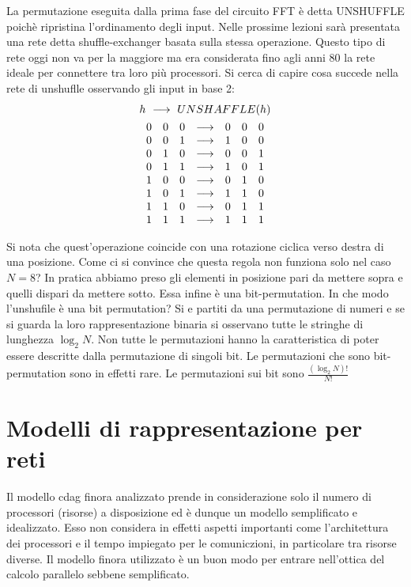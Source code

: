 \documentclass[a4paper,portrait,12pt]{article}
\theoremstyle{definition}
\begin{document}
La permutazione eseguita dalla prima fase del circuito FFT è detta UNSHUFFLE poichè ripristina l’ordinamento degli input.
Nelle prossime lezioni sarà presentata una rete detta shuffle-exchanger basata sulla stessa operazione.
Questo tipo di rete oggi non va per la maggiore ma era considerata fino agli anni 80 la rete ideale per connettere tra loro più processori.
Si cerca di capire cosa succede nella rete di unshuflle osservando gli input in base 2:
\begin{gather*}
h\ \longrightarrow\ UNSHAFFLE(h)\\
\begin{array}{c c c c c c c}
0 & 0 & 0 & \longrightarrow & 0 & 0 & 0\\
0 & 0 & 1 & \longrightarrow & 1 & 0 & 0\\
0 & 1 & 0 & \longrightarrow & 0 & 0 & 1\\
0 & 1 & 1 & \longrightarrow & 1 & 0 & 1\\
1 & 0 & 0 & \longrightarrow & 0 & 1 & 0\\
1 & 0 & 1 & \longrightarrow & 1 & 1 & 0\\
1 & 1 & 0 & \longrightarrow & 0 & 1 & 1\\
1 & 1 & 1 & \longrightarrow & 1 & 1 & 1\\
\end{array}
\end{gather*}

Si nota che quest’operazione coincide con una rotazione ciclica verso destra di una posizione.
Come ci si convince che questa regola non funziona solo nel caso $N=8$?
In pratica abbiamo preso gli elementi in posizione pari da mettere sopra e quelli dispari da mettere sotto.
Essa infine è una bit-permutation.
In che modo l’unshufile è una bit permutation?
Si e partiti da una permutazione di numeri e se si
guarda la loro rappresentazione binaria si osservano tutte le stringhe di lunghezza $\log_2 N$.
Non tutte le permutazioni hanno la caratteristica di poter essere descritte dalla permutazione di singoli bit.
Le permutazioni che sono bit-permutation sono in effetti rare.
Le permutazioni sui bit sono $\frac{(\log_2 N)!}{N!}$


\section{Modelli di rappresentazione per reti}

Il modello cdag finora analizzato prende in considerazione solo il numero di processori (risorse) a disposizione ed è dunque un modello semplificato e idealizzato.
Esso non considera in effetti aspetti importanti come l’architettura dei processori e il tempo impiegato per le comuniczioni, in particolare tra risorse diverse.
Il modello finora utilizzato è un buon modo per entrare nell’ottica del calcolo parallelo sebbene semplificato.\\
\end{document}
